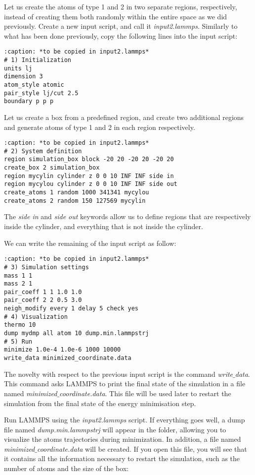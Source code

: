 Let us create the atoms of type 1 and 2 in two separate
regions, respectively, instead of creating them both randomly 
within the entire space as we did previously. Create a new input script, and call
it \textit{input2.lammps}. Similarly to what has been done previously, copy the following lines
into the input script:

\begin{verbatim}
:caption: *to be copied in input2.lammps*
# 1) Initialization
units lj
dimension 3
atom_style atomic
pair_style lj/cut 2.5
boundary p p p
\end{verbatim}

\noindent Let us create a box from a predefined region,
and create two additional regions and generate
atoms of type 1 and 2 in each region respectively.

\begin{verbatim}
:caption: *to be copied in input2.lammps*
# 2) System definition
region simulation_box block -20 20 -20 20 -20 20
create_box 2 simulation_box
region mycylin cylinder z 0 0 10 INF INF side in
region mycylou cylinder z 0 0 10 INF INF side out
create_atoms 1 random 1000 341341 mycylou
create_atoms 2 random 150 127569 mycylin
\end{verbatim}

\noindent The \textit{side in} and \textit{side out} keywords
allow us to define regions that are respectively inside the
cylinder, and everything that is not inside the cylinder.

We can write the remaining of the input script as follow:

\begin{verbatim}
:caption: *to be copied in input2.lammps*
# 3) Simulation settings
mass 1 1
mass 2 1
pair_coeff 1 1 1.0 1.0
pair_coeff 2 2 0.5 3.0
neigh_modify every 1 delay 5 check yes
# 4) Visualization
thermo 10
dump mydmp all atom 10 dump.min.lammpstrj
# 5) Run
minimize 1.0e-4 1.0e-6 1000 10000
write_data minimized_coordinate.data
\end{verbatim}

\noindent The novelty with respect to the previous
input script is the command \textit{write$\_$data}. This command
asks LAMMPS to print the final state of the simulation in
a file named \textit{minimized$\_$coordinate.data}. This file will
be used later to restart the simulation from the final
state of the energy minimisation step.

Run LAMMPS using the \textit{input2.lammps} script. If everything
goes well, a dump file named \textit{dump.min.lammpstrj} will
appear in the folder, allowing you to visualize the atoms
trajectories during minimization. In
addition, a file named \textit{minimized$\_$coordinate.data} will be
created. If you open this file, you will see that it
contains all the information necessary to restart the
simulation, such as the number of atoms and the size of
the box:

